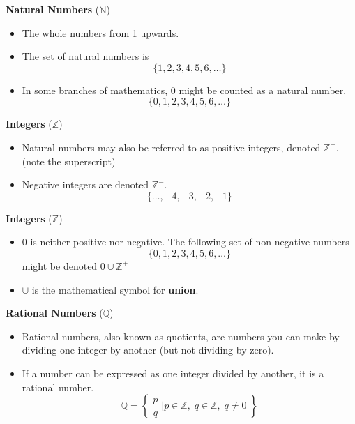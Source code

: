 \documentclass[11pt,a4paper,titlepage,oneside,openany]{article}
\numberwithin{equation}{section}
\numberwithin{algorithm}{section}
\numberwithin{figure}{section}
\numberwithin{table}{section}
\begin{document}
{%
\textbf{Natural Numbers} ($\mathbb{N}$)
\begin{itemize}
\item The whole numbers from 1 upwards. 

\item The set of natural numbers is 
\[\{1,2,3,4,5,6,\ldots\} \]
\item In some branches of mathematics, $0$ might be counted as a natural number.
\[\{0,1,2,3,4,5,6,\ldots\} \]
\end{itemize}






\textbf{Integers} ($\mathbb{Z}$)
\begin{itemize}
\item Natural numbers may also be referred to as positive integers, denoted $\mathbb{Z}^{+}$. \\(note the superscript)
\item Negative integers are denoted $\mathbb{Z}^{-}$.
\[\{\ldots,-4,-3,-2,-1\}\]
\end{itemize}


\textbf{Integers} ($\mathbb{Z}$)
\begin{itemize}
\item 0 is neither positive nor negative. The following set of non-negative numbers \[\{0,1,2,3,4,5,6,\ldots\} \] might be denoted $0 \cup \mathbb{Z}^{+}$
\item $\cup$ is the mathematical symbol for \textbf{union}.
\end{itemize}



\textbf{Rational Numbers} ($\mathbb{Q}$)
\begin{itemize}
\item Rational numbers, also known as quotients, are numbers you can make by dividing one integer by another (but not dividing by zero). 
\item If a number can be expressed as one integer divided by another, it is a rational number.
\[ \mathbb{Q} = \left\{\; \frac{p}{q} \;\bigg| p \in \mathbb{Z},\; q \in \mathbb{Z},\; q \neq 0  \;   \right\}   \]
\end{itemize}

}
\end{document}
